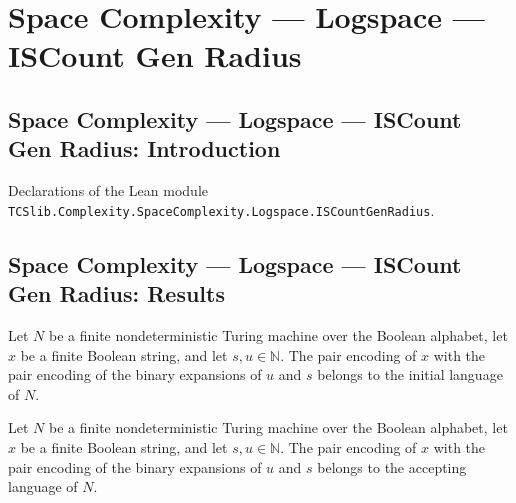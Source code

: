 \section{Space Complexity --- Logspace --- ISCount Gen Radius}
\subsection*{Space Complexity --- Logspace --- ISCount Gen Radius: Introduction}

Declarations of the Lean module \texttt{TCSlib.Complexity.SpaceComplexity.Logspace.ISCountGenRadius}.

\subsection*{Space Complexity --- Logspace --- ISCount Gen Radius: Results}

\begin{definition}
\label{Complexity.LogProg.ISGen.InitM}
\leanok
{}
Let $N$ be a finite nondeterministic Turing machine over the Boolean alphabet, let $x$
be a finite Boolean string, and let $s,u\in\mathbb{N}$. The pair encoding of $x$ with
the pair encoding of the binary expansions of $u$ and $s$ belongs to the initial
language of $N$.
\end{definition}

\begin{definition}
\label{Complexity.LogProg.ISGen.AccM}
\leanok
{}
Let $N$ be a finite nondeterministic Turing machine over the Boolean alphabet, let $x$
be a finite Boolean string, and let $s,u\in\mathbb{N}$. The pair encoding of $x$ with
the pair encoding of the binary expansions of $u$ and $s$ belongs to the accepting
language of $N$.
\end{definition}


